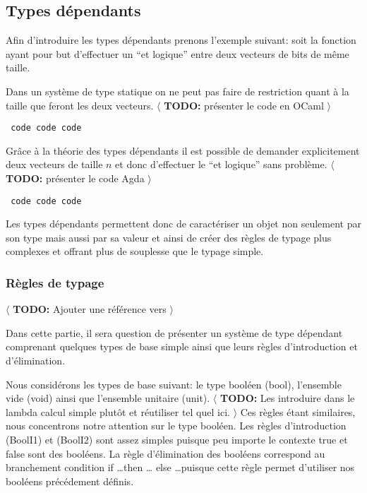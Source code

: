 \documentclass{article}
\newcommand{\TODO}[1]{$\langle$ \textbf{TODO:} #1 $\rangle$}
\theoremstyle{definition}
\theoremstyle{remark}
\begin{document}
\subsection{Types dépendants}

Afin d'introduire les types dépendants prenons l'exemple suivant: soit
la fonction ayant pour but d'effectuer un ``et logique'' entre deux
vecteurs de bits de même taille.

Dans un système de type statique on ne peut pas faire de restriction
quant à la taille que feront les deux vecteurs.  
\TODO{présenter le code en OCaml}

\begin{verbatim}
 code code code
\end{verbatim}

Grâce à la théorie des types dépendants il est possible de demander
explicitement deux vecteurs de taille \(n\) et donc d'effectuer le
``et logique'' sans problème. 
\TODO{présenter le code Agda}

\begin{verbatim}
 code code code
\end{verbatim}


Les types dépendants permettent donc de caractériser un objet non
seulement par son type mais aussi par sa valeur et ainsi de créer des
règles de typage plus complexes et offrant plus de souplesse que le
typage simple.

\subsubsection{Règles de typage}

\TODO{Ajouter une référence vers \citep{hottbook,thompson:types-fp}}

Dans cette partie, il sera question de présenter un système de type
dépendant comprenant quelques types de base simple ainsi que leurs
règles d'introduction et d'élimination.

Nous considérons les types de base suivant: le type booléen
(\textsf{bool}), l'ensemble vide (\textsf{void}) ainsi que l'ensemble
unitaire (\textsf{unit}). \TODO{Les introduire dans le lambda calcul
  simple plutôt et réutiliser tel quel ici.} Ces règles étant
similaires, nous concentrons notre attention sur le type booléen. Les
règles d'introduction (BoolI1) et (BoolI2) sont assez simples puisque
peu importe le contexte \textsf{true} et \textsf{false} sont des
booléens.  La règle d'élimination des booléens correspond au
branchement condition \textsf{if} \ldots \textsf{then} \ldots
\textsf{else} \ldots puisque cette règle permet d'utiliser nos
booléens précédement définis.
\end{document}
